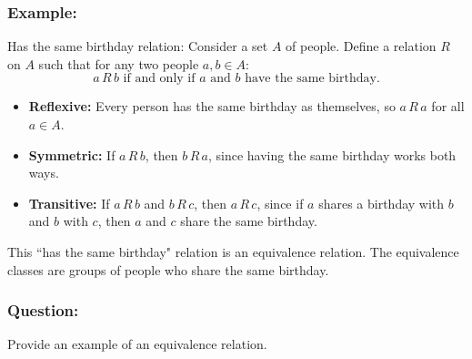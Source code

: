 \begin{enumerate}
\begin{itemize}
                \subsubsection*{Example:}
                Has the same birthday relation: Consider a set \(A\) of people. Define a relation \(R\) on \(A\) such that for any two people \(a, b \in A\):
                \[
                a \, R \, b \text{ if and only if } a \text{ and } b \text{ have the same birthday}.
                \]
                \begin{itemize}
                    \item \textbf{Reflexive:} Every person has the same birthday as themselves, so \(a \, R \, a\) for all \(a \in A\).
                    \item \textbf{Symmetric:} If \(a \, R \, b\), then \(b \, R \, a\), since having the same birthday works both ways.
                    \item \textbf{Transitive:} If \(a \, R \, b\) and \(b \, R \, c\), then \(a \, R \, c\), since if \(a\) shares a birthday with \(b\) and \(b\) with \(c\), then \(a\) and \(c\) share the same birthday.
                \end{itemize}
                This ``has the same birthday" relation is an equivalence relation. The equivalence classes are groups of people who share the same birthday.

                \subsubsection*{Question:} 
                \qquad Provide an example of an equivalence relation.
        \end{itemize}
\end{enumerate}

\vspace*{- 0.1cm}


